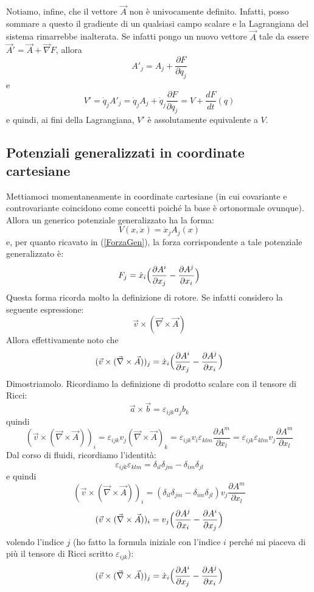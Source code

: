 \documentclass[a4paper,openany]{article}
\begin{document}
	Notiamo, infine, che il vettore $\vec{A}$ non è univocamente definito. Infatti, posso sommare a questo il gradiente di un qualsiasi campo scalare e la Lagrangiana del sistema rimarrebbe inalterata. Se infatti pongo un nuovo vettore $\vec{A}$ tale da essere $\vec{A}' = \vec{A}+\vec{\nabla}F$, allora
	$$
	A'_j = A_j + \dfrac{\partial F}{\partial q_j}
	$$
	e
	$$
	V' = \dot{q}_j A'_j = \dot{q}_j A_j  + \dot{q}_j\dfrac{\partial F}{\partial q_j} = V + \dfrac{dF}{dt}(q)
	$$
	e quindi, ai fini della Lagrangiana, $V'$ è assolutamente equivalente a $V$.
	\subsection{Potenziali generalizzati in coordinate cartesiane}
	Mettiamoci momentaneamente in coordinate cartesiane (in cui covariante e controvariante coincidono come concetti poiché la base è ortonormale ovunque). Allora un generico potenziale generalizzato ha la forma:
	$$
	V(x,\dot{x}) = \dot{x}_j A_j(x)
	$$
	e, per quanto ricavato in (\ref{ForzaGen}), la forza corrispondente a tale potenziale generalizzato è:
	$$
	F_j = \dot{x}_i \Bigl(\dfrac{\partial A^i}{\partial x_j} -\dfrac{\partial A^j}{\partial x_i}\Bigl)
	$$
	Questa forma ricorda molto la definizione di rotore. Se infatti considero la seguente espressione:
	$$
	\vec{v} \times (\vec{\nabla}\times \vec{A})
	$$
	Allora effettivamente noto che
	$$
	(\vec{v} \times (\vec{\nabla}\times \vec{A}))_j = \dot{x}_i \Bigl(\dfrac{\partial A^i}{\partial x_j} -\dfrac{\partial A^j}{\partial x_i}\Bigl) 
	$$
	Dimostriamolo. Ricordiamo la definizione di prodotto scalare con il tensore di Ricci:
	$$
	\vec{a}\times \vec{b} = \varepsilon_{ijk}a_jb_k
	$$
	quindi
	$$
	(\vec{v} \times (\vec{\nabla}\times \vec{A}))_i = \varepsilon_{ijk}v_j(\vec{\nabla}\times \vec{A})_k = \varepsilon_{ijk}v_i \varepsilon_{klm}\dfrac{\partial A^{m}}{\partial x_l}= \varepsilon_{ijk}\varepsilon_{klm}v_j \dfrac{\partial A^{m}}{\partial x_l}
	$$
	Dal corso di fluidi, ricordiamo l'identità:
	$$
	\varepsilon_{ijk}\varepsilon_{klm} = \delta_{il}\delta_{jm}-\delta_{im}\delta_{jl}
	$$
	e quindi
	$$
	(\vec{v} \times (\vec{\nabla}\times \vec{A}))_i =( \delta_{il}\delta_{jm}-\delta_{im}\delta_{jl})v_j \dfrac{\partial A^{m}}{\partial x_l}
	$$	
	$$
	(\vec{v} \times (\vec{\nabla}\times \vec{A}))_i =v_j\Bigl( \dfrac{\partial A^{j}}{\partial x_i}- \dfrac{\partial A^{i}}{\partial x_j}\Bigl)
	$$	
	volendo l'indice $j$ (ho fatto la formula iniziale con l'indice $i$ perché mi piaceva di più il tensore di Ricci scritto $\varepsilon_{ijk}$):
	$$
	(\vec{v} \times (\vec{\nabla}\times \vec{A}))_j = \dot{x}_i \Bigl(\dfrac{\partial A^i}{\partial x_j} -\dfrac{\partial A^j}{\partial x_i}\Bigl) 
	$$
\end{document}
